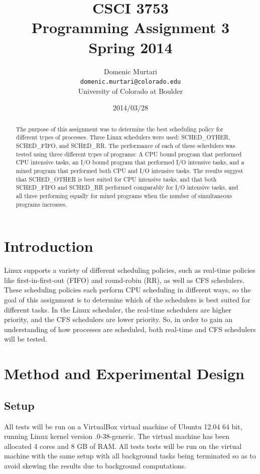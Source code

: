 \documentclass[12pt]{article}
\title{CSCI 3753 \\ Programming Assignment 3 \\ Spring 2014}
\author{
  Domenic Murtari \\
  \texttt{domenic.murtari@colorado.edu}\\
  University of Colorado at Boulder
}
\date{2014/03/28}
\begin{document}
\maketitle
\tableofcontents

\newpage

\begin{abstract}
The purpose of this assignment was to determine the best scheduling policy for
different types of processes. Three Linux schedulers were used: SCHED\_OTHER, 
SCHED\_FIFO, and SCHED\_RR. The performance of each of these schedulers was 
tested using three different types of programs: A CPU bound program that 
performed CPU intensive tasks, an I/O bound program that performed I/O intensive
tasks, and a mixed program that performed both CPU and I/O intensive tasks. 
The results suggest that SCHED\_OTHER is best suited for CPU intensive tasks,
and that both SCHED\_FIFO and SCHED\_RR performed comparably for I/O intensive
tasks, and all three performing equally for mixed programs when the number of
simultaneous programs increases.
\end{abstract}

\section{Introduction}

Linux supports a variety of different scheduling policies, such as real-time
policies like first-in-first-out (FIFO) and round-robin (RR), as well as CFS
schedulers. These scheduling policies each perform CPU scheduling in different
ways, so the goal of this assignment is to determine which of the schedulers
is best suited for different tasks. In the Linux scheduler, the real-time 
schedulers are higher priority, and the CFS schedulers are lower priority. So, 
in order to gain an understanding of how processes are scheduled, both real-time
and CFS schedulers will be tested.


\section{Method and Experimental Design}

\subsection{Setup}
All tests will be run on a VirtualBox virtual machine of Ubuntu 12.04 64 bit, 
running Linux kernel version {.0-38-generic}. The virtual machine 
has been allocated 4 cores and 8 GB of RAM. All tests tests will be run on the 
virtual machine with the same setup with all background tasks being terminated 
so as to avoid skewing the results due to background computations. 
\end{document}
